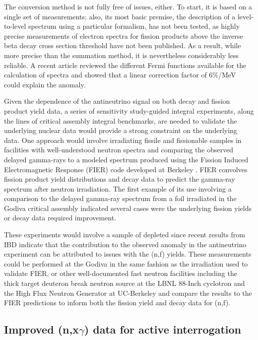 \documentclass[letterpaper,draft]{ar-1col}
\begin{document}
The conversion method is not fully free of issues, either.  To start, it is based on a single set of measurements; also, its most basic premise, the description of a level-to-level spectrum using a particular formalism, has not been tested, as highly precise measurements of electron spectra for fission products above the inverse beta decay cross section threshold have not been published.    As a result, while more precise than the summation method, it is nevertheless considerably less reliable.     A recent article \cite{Son17} reviewed the different Fermi functions available for the calculation of spectra and showed that a linear correction factor of 6\%/MeV could explain the anomaly.

Given the dependence of the antineutrino signal on both decay and fission product yield data, a series of sensitivity study-guided integral experiments, along the lines of critical assembly integral benchmarks, are needed to validate the underlying nuclear data would provide a strong constraint on the underlying data.  One approach would involve irradiating fissile and fissionable samples in facilities with well-understood neutron spectra and comparing the observed delayed gamma-rays to a modeled spectrum produced using the Fission Induced Electromagnetic Response (FIER) code developed at Berkeley \cite{Matthews2018}.  FIER convolves fission product yield distributions and decay data to predict the gamma-ray spectrum after neutron irradiation.  The first example of its use involving a comparison to the delayed gamma-ray spectrum from a  foil irradiated in the Godiva critical assembly indicated several cases were the underlying fission yields or decay data required improvement. 

These experiments would involve a sample of depleted  since recent results from IBD indicate that the contribution to the observed anomaly in the antineutrino experiment can be attributed to issues with the (n,f) yields. These measurements could be performed at the Godiva in the same fashion as the  irradiation used to validate FIER, or other well-documented fast neutron facilities including the thick target deuteron break neutron source at the LBNL 88-Inch cyclotron \cite{Harrig2018} and the High Flux Neutron Generator at UC-Berkeley \cite{All18} and compare the results to the FIER predictions to inform both the fission yield and decay data for (n,f). 

\subsection{Improved (n,x$\gamma$) data for active interrogation}
\end{document}
